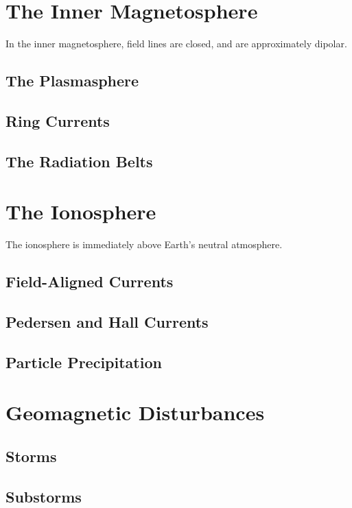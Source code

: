 \section{The Inner Magnetosphere}

In the inner magnetosphere, field lines are closed, and are approximately dipolar. 

\subsection{The Plasmasphere}

\subsection{Ring Currents}

\subsection{The Radiation Belts}

\section{The Ionosphere}

The ionosphere is immediately above Earth's neutral atmosphere. 

\subsection{Field-Aligned Currents}

\subsection{Pedersen and Hall Currents}

\subsection{Particle Precipitation}

\section{Geomagnetic Disturbances}

\subsection{Storms}

\subsection{Substorms}






